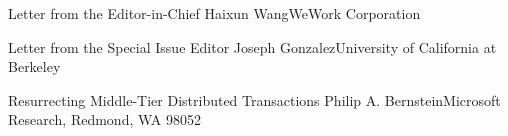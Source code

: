 \documentclass[11pt]{article}
\begin{document}


\begin{bulletin}


%
%

\begin{lettersection}


\begin{letter}{Letter from the Editor-in-Chief}
{Haixun Wang}{WeWork Corporation}

\end{letter}
%
\newpage
%
%
\begin{letter}{Letter from the Special Issue Editor}
{Joseph Gonzalez}{University of California at Berkeley}


\end{letter}

\end{lettersection}


\begin{opinionsection}
\begin{opinion}{Resurrecting Middle-Tier Distributed Transactions}
{Philip A. Bernstein}{Microsoft Research, Redmond, WA 98052}

\end{opinion}
\end{opinionsection}


\end{bulletin}
\end{document}

